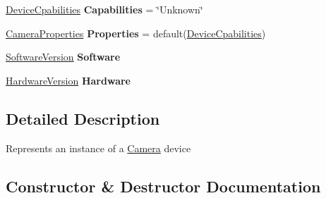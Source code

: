 \begin{DoxyCompactItemize}
\mbox{\label{class_a_n_d_o_r___c_s_1_1_classes_1_1_camera_a2d67afc8468e5feb7432690d82ca1a8a}} 
\hyperlink{struct_a_n_d_o_r___c_s_1_1_data_structures_1_1_device_cpabilities}{Device\+Cpabilities} {\bfseries Capabilities} = \char`\"{}Unknown\char`\"{}
\item 
\mbox{\label{class_a_n_d_o_r___c_s_1_1_classes_1_1_camera_a04f7dfb0bde5044c16f1a230e356647c}} 
\hyperlink{struct_a_n_d_o_r___c_s_1_1_data_structures_1_1_camera_properties}{Camera\+Properties} {\bfseries Properties} = default(\hyperlink{struct_a_n_d_o_r___c_s_1_1_data_structures_1_1_device_cpabilities}{Device\+Cpabilities})
\item 
\mbox{\label{class_a_n_d_o_r___c_s_1_1_classes_1_1_camera_a2d9c3174ebe9bc98243b2f355b30e194}} 
\hyperlink{struct_a_n_d_o_r___c_s_1_1_data_structures_1_1_software_version}{Software\+Version} {\bfseries Software}
\item 
\mbox{\label{class_a_n_d_o_r___c_s_1_1_classes_1_1_camera_aa582e5b0c9b39977b2227cc8eb509b4d}} 
\hyperlink{struct_a_n_d_o_r___c_s_1_1_data_structures_1_1_hardware_version}{Hardware\+Version} {\bfseries Hardware}
\end{DoxyCompactItemize}


\subsection{Detailed Description}
Represents an instance of a \hyperlink{class_a_n_d_o_r___c_s_1_1_classes_1_1_camera}{Camera} device 



\subsection{Constructor \& Destructor Documentation}
\mbox{\label{class_a_n_d_o_r___c_s_1_1_classes_1_1_camera_ae095295c5e29f6b143a811eec79aa072}} 
